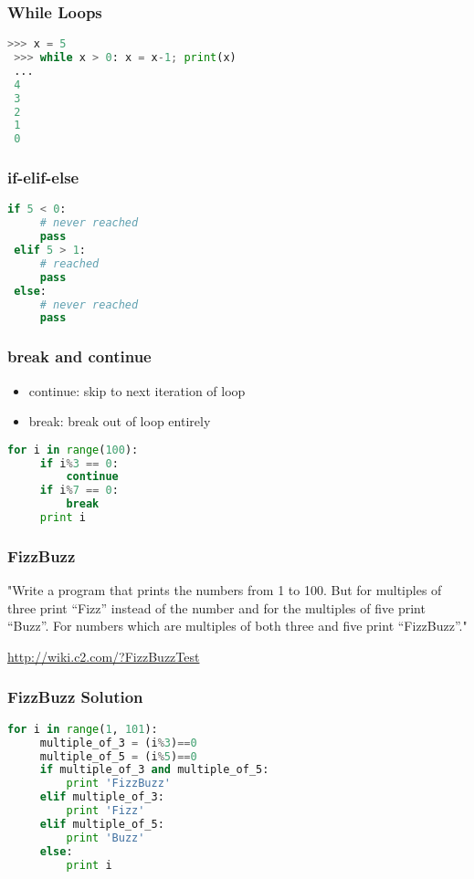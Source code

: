 \documentclass[hyperref={colorlinks, linkcolor=blue, urlcolor=blue}]{beamer}
\begin{document}
\begin{frame}[fragile]
  \frametitle{While Loops}
  \begin{lstlisting}[language=Python]
 >>> x = 5
 >>> while x > 0: x = x-1; print(x)
 ... 
 4
 3
 2
 1
 0
  \end{lstlisting}
\end{frame}

\begin{frame}[fragile]
  \frametitle{if-elif-else}
  \begin{lstlisting}[language=Python]
 if 5 < 0:
     # never reached
     pass
 elif 5 > 1:
     # reached
     pass
 else:
     # never reached
     pass
  \end{lstlisting}
\end{frame}

\begin{frame}[fragile]
  \frametitle{break and continue}

  \begin{itemize}
  \item continue: skip to next iteration of loop
  \item break: break out of loop entirely
  \end{itemize}
  
  \begin{lstlisting}[language=Python]
 for i in range(100):
     if i%3 == 0:
         continue
     if i%7 == 0:
         break
     print i
  \end{lstlisting}
\end{frame}

\begin{frame}
  \frametitle{FizzBuzz}

  "Write a program that prints the numbers from 1 to 100. But for multiples of three print “Fizz”
  instead of the number and for the multiples of five print “Buzz”. For numbers which are multiples
  of both three and five print “FizzBuzz”."

  \url{http://wiki.c2.com/?FizzBuzzTest}
\end{frame}

\begin{frame}[fragile]
  \frametitle{FizzBuzz Solution}
  \begin{lstlisting}[language=Python]
 for i in range(1, 101):
     multiple_of_3 = (i%3)==0
     multiple_of_5 = (i%5)==0
     if multiple_of_3 and multiple_of_5:
         print 'FizzBuzz'
     elif multiple_of_3:
         print 'Fizz'
     elif multiple_of_5:
         print 'Buzz'
     else:
         print i
  \end{lstlisting}

\end{frame}
\end{document}
